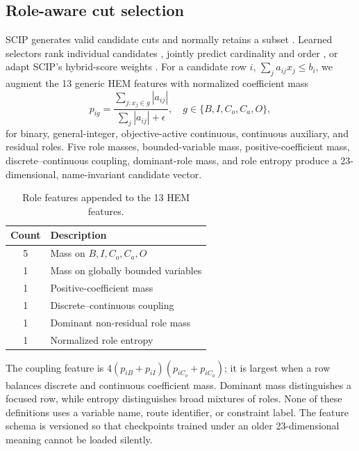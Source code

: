\documentclass{ifacconf}
\begin{document}
\subsection{Role-aware cut selection}

SCIP generates valid candidate cuts and normally retains a subset \citep{bestuzheva2023scip}. Learned selectors rank individual candidates \citep{huang2022learning}, jointly predict cardinality and order \citep{wang2023hem}, or adapt SCIP's hybrid-score weights \citep{turner2023adaptive}. For a candidate row $i$, $\sum_j a_{ij}x_j\le b_i$, we augment the 13 generic HEM features with normalized coefficient mass
\begin{equation}
p_{ig}=\frac{\sum_{j:x_j\in g}|a_{ij}|}{\sum_j|a_{ij}|+\epsilon},
\quad g\in\{B,I,C_o,C_a,O\},
\label{eq:roles}
\end{equation}
for binary, general-integer, objective-active continuous, continuous auxiliary, and residual roles. Five role masses, bounded-variable mass, positive-coefficient mass, discrete--continuous coupling, dominant-role mass, and role entropy produce a 23-dimensional, name-invariant candidate vector.

\begin{table}[t]
\begin{center}
\caption{Role features appended to the 13 HEM features.}\label{tab:features}
\begin{tabular}{cl}
\toprule
Count & Description\\
\midrule
5 & Mass on $B,I,C_o,C_a,O$\\
1 & Mass on globally bounded variables\\
1 & Positive-coefficient mass\\
1 & Discrete--continuous coupling\\
1 & Dominant non-residual role mass\\
1 & Normalized role entropy\\
\bottomrule
\end{tabular}
\end{center}
\end{table}

The coupling feature is $4(p_{iB}+p_{iI})(p_{iC_o}+p_{iC_a})$; it is largest when a row balances discrete and continuous coefficient mass. Dominant mass distinguishes a focused row, while entropy distinguishes broad mixtures of roles. None of these definitions uses a variable name, route identifier, or constraint label. The feature schema is versioned so that checkpoints trained under an older 23-dimensional meaning cannot be loaded silently.
\end{document}
